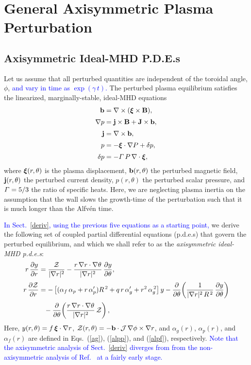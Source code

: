 \documentclass[12pt,prb,aps]{revtex4-1}
\newcommand {\bxi}{\mbox{\boldmath$\xi$}}
\begin{document}
\section{General Axisymmetric Plasma Perturbation}\label{opde}

\subsection{Axisymmetric Ideal-MHD P.D.E.s}\label{pde}
Let us assume that all perturbed quantities are independent of the toroidal angle, $\phi$,  \textcolor{blue}{and vary in time
as $\exp(\gamma\,t)$. }
The perturbed plasma equilibrium satisfies the  linearized, marginally-stable, ideal-MHD equations\,\cite{connor,am1,gs1}
\begin{align}
{\bf b} &= \nabla\times (\bxi\times {\bf B}),\label{e21}\\[0.5ex]
\nabla p &={\bf j}\times {\bf B}  +{\bf J}\times {\bf b},\label{e22}\\[0.5ex]
{\bf j} &= \nabla\times {\bf b},\label{e23}\\[0.5ex]
p&= -\bxi\cdot\nabla P+\delta p,\label{e24}\\[0.5ex]
\delta p &= - {\mit\Gamma}\,P\,\nabla\cdot\bxi,\label{e25ii}
\end{align}
where $\bxi(r,\theta)$ is the plasma displacement, ${\bf b}(r,\theta)$ the perturbed magnetic field,
${\bf j}(r,\theta)$ the perturbed current density, $p(r,\theta)$ the perturbed scalar pressure, and ${\mit\Gamma}=5/3$ the ratio of specific heats.
Here, we are neglecting plasma inertia on the assumption that the wall slows the growth-time of the perturbation such that it is much longer than the Alfv\'{e}n time. 

\textcolor{blue}{In Sect.~\ref{deriv}, using the previous five equations as a starting point,} we derive the following set of coupled partial differential equations (p.d.e.s) that govern the perturbed equilibrium,  and which we shall refer to as the 
{\em axisymmetric ideal-MHD p.d.e.s}:
\begin{align}\label{e63yy}
r\,\frac{\partial y}{\partial r} &= \frac{{\cal Z}}{|\nabla r|^2} - \frac{r\,\nabla r\cdot\nabla\theta}{|\nabla r|^2}\,\frac{\partial y}{\partial\theta},\\[0.5ex]
r\,\frac{\partial {\cal Z}}{\partial r}&= -\left[(\alpha_f\,\alpha_p+ r\,\alpha_p')R^{\,2} + q\,r\,\alpha_g'+r^2\,\alpha_g^{\,2}\right]y-\frac{\partial}{\partial\theta}\!\left(\frac{1}{|\nabla r|^2\,R^{\,2}}\,\frac{\partial y}{\partial\theta}\right)\nonumber\\[0.5ex]
&\phantom{=} -\frac{\partial}{\partial\theta}\!\left(\frac{r\,\nabla r\cdot\nabla\theta}{|\nabla r|^2}\,{\cal Z}\right),\label{e64yy}
\end{align}
Here,  $y(r,\theta)=f\,\bxi\cdot\nabla r$, ${\cal Z}(r,\theta)= -{\bf b}\cdot {\cal J}\,\nabla\phi\times \nabla r$, and $\alpha_g(r)$, $\alpha_p(r)$,
and $\alpha_f(r)$ are defined in Eqs.~(\ref{ag}), (\ref{alpp}), and (\ref{alpf}), respectively. \textcolor{blue}{Note that the axisymmetric analysis  of Sect.~\ref{deriv}
diverges from from the non-axisymmetric analysis of Ref.~ at a fairly early stage. }
\end{document}
